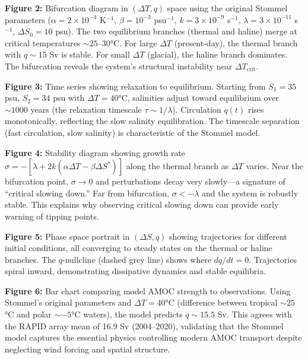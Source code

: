 \documentclass[12pt,letterpaper]{article}
\begin{document}
\noindent \textbf{Figure 2:} Bifurcation diagram in $(\Delta T, q)$ space using the original Stommel parameters ($\alpha = 2 \times 10^{-4}$ K$^{-1}$, $\beta = 10^{-3}$ psu$^{-1}$, $k = 3 \times 10^{-9}$ s$^{-1}$, $\lambda = 3 \times 10^{-11}$ s$^{-1}$, $\Delta S_0 = 10$ psu). The two equilibrium branches (thermal and haline) merge at critical temperatures $\sim 25$--30°C. For large $\Delta T$ (present-day), the thermal branch with $q \sim 15$ Sv is stable. For small $\Delta T$ (glacial), the haline branch dominates. The bifurcation reveals the system's structural instability near $\Delta T_{\text{crit}}$.

\noindent \textbf{Figure 3:} Time series showing relaxation to equilibrium. Starting from $S_1 = 35$ psu, $S_2 = 34$ psu with $\Delta T = 40$°C, salinities adjust toward equilibrium over $\sim 1000$ years (the relaxation timescale $\tau \sim 1/\lambda$). Circulation $q(t)$ rises monotonically, reflecting the slow salinity equilibration. The timescale separation (fast circulation, slow salinity) is characteristic of the Stommel model.

\noindent \textbf{Figure 4:} Stability diagram showing growth rate $\sigma = -[\lambda + 2k(\alpha\Delta T - \beta\Delta S^*)]$ along the thermal branch as $\Delta T$ varies. Near the bifurcation point, $\sigma \to 0$ and perturbations decay very slowly---a signature of ``critical slowing down.'' Far from bifurcation, $\sigma < -\lambda$ and the system is robustly stable. This explains why observing critical slowing down can provide early warning of tipping points.

\noindent \textbf{Figure 5:} Phase space portrait in $(\Delta S, q)$ showing trajectories for different initial conditions, all converging to steady states on the thermal or haline branches. The $q$-nullcline (dashed grey line) shows where $dq/dt = 0$. Trajectories spiral inward, demonstrating dissipative dynamics and stable equilibria.

\noindent \textbf{Figure 6:} Bar chart comparing model AMOC strength to observations. Using Stommel's original parameters and $\Delta T = 40$°C (difference between tropical $\sim 25$°C and polar $\sim -5$°C waters), the model predicts $q \sim 15.5$ Sv. This agrees with the RAPID array mean of 16.9 Sv (2004--2020), validating that the Stommel model captures the essential physics controlling modern AMOC transport despite neglecting wind forcing and spatial structure.
\end{document}
